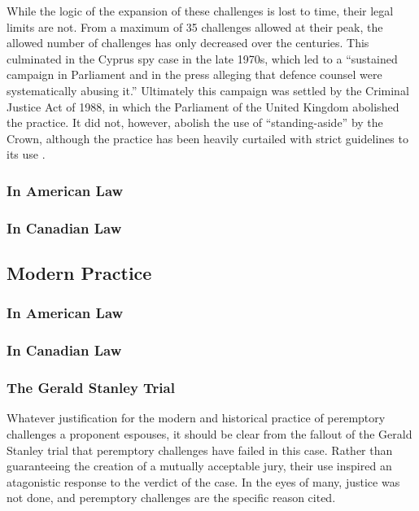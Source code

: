 \documentclass{article}
\begin{document}
While the logic of the expansion of these challenges is lost to time, their legal limits are not. From a maximum of 35 challenges
allowed at their peak, the allowed number of challenges has only decreased over the centuries. This culminated in the Cyprus spy
case in the late 1970s, which led to a ``sustained campaign in Parliament and in the press alleging that defence counsel were
systematically abusing it.''\cite{hoffman1997} Ultimately this campaign was settled by the Criminal Justice Act of 1988, in which
the Parliament of the United Kingdom abolished the practice. It did not, however, abolish the use of ``standing-aside'' by the
Crown, although the practice has been heavily curtailed with strict guidelines to its use \cite{attgenguide}.

\subsubsection{In American Law}

\subsubsection{In Canadian Law}

\subsection{Modern Practice} \label{subsec:modprac}

\subsubsection{In American Law}

\subsubsection{In Canadian Law}

\subsubsection{The Gerald Stanley Trial}

Whatever justification for the modern and historical practice of peremptory challenges a proponent espouses, it should be clear
from the fallout of the Gerald Stanley trial that peremptory challenges have failed in this case. Rather than guaranteeing the
creation of a mutually acceptable jury, their use inspired an atagonistic response to the verdict of the case. In the eyes of
many, justice was not done, and peremptory challenges are the specific reason cited.
\end{document}
